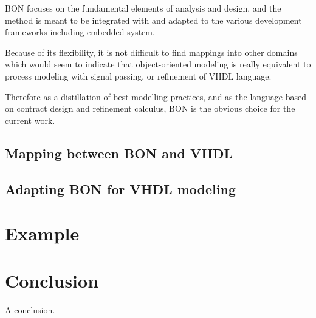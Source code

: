 \documentclass{article}
\newcommand{\todo}{\textbf{TODO:}}
\begin{document}
BON focuses on the fundamental elements of analysis and design, and the method is
meant to be integrated with and adapted to the various development frameworks
including embedded system.

Because of its flexibility, it is not difficult to find mappings into other domains
which would seem to indicate that object-oriented modeling is really equivalent
to process modeling with signal passing, or refinement of VHDL language.

Therefore as a distillation of best modelling practices, and as the 
language based on contract design and refinement calculus, BON
is the obvious choice for the current work.

\subsection{Mapping between BON and VHDL}
\subsection{Adapting BON for VHDL modeling }

\section{Example}

\section{Conclusion}

A conclusion.




\end{document}
